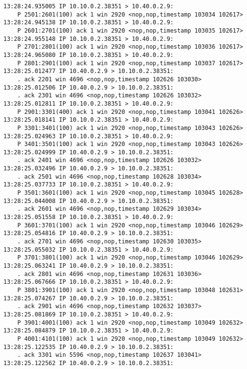 \documentclass[a4paper,12pt]{article}
\begin{document}
\begin{Verbatim}
13:28:24.935005 IP 10.10.0.2.38351 > 10.40.0.2.9: 
    P 2501:2601(100) ack 1 win 2920 <nop,nop,timestamp 103034 102617>
13:28:24.945138 IP 10.10.0.2.38351 > 10.40.0.2.9: 
    P 2601:2701(100) ack 1 win 2920 <nop,nop,timestamp 103035 102617>
13:28:24.955148 IP 10.10.0.2.38351 > 10.40.0.2.9: 
    P 2701:2801(100) ack 1 win 2920 <nop,nop,timestamp 103036 102617>
13:28:24.965080 IP 10.10.0.2.38351 > 10.40.0.2.9: 
    P 2801:2901(100) ack 1 win 2920 <nop,nop,timestamp 103037 102617>
13:28:25.012477 IP 10.40.0.2.9 > 10.10.0.2.38351: 
    . ack 2201 win 4696 <nop,nop,timestamp 102626 103030>
13:28:25.012506 IP 10.40.0.2.9 > 10.10.0.2.38351: 
    . ack 2301 win 4696 <nop,nop,timestamp 102626 103032>
13:28:25.012811 IP 10.10.0.2.38351 > 10.40.0.2.9: 
    P 2901:3301(400) ack 1 win 2920 <nop,nop,timestamp 103041 102626>
13:28:25.018141 IP 10.10.0.2.38351 > 10.40.0.2.9: 
    P 3301:3401(100) ack 1 win 2920 <nop,nop,timestamp 103043 102626>
13:28:25.024963 IP 10.10.0.2.38351 > 10.40.0.2.9: 
    P 3401:3501(100) ack 1 win 2920 <nop,nop,timestamp 103043 102626>
13:28:25.024999 IP 10.40.0.2.9 > 10.10.0.2.38351: 
    . ack 2401 win 4696 <nop,nop,timestamp 102626 103032>
13:28:25.032496 IP 10.40.0.2.9 > 10.10.0.2.38351: 
    . ack 2501 win 4696 <nop,nop,timestamp 102628 103034>
13:28:25.037733 IP 10.10.0.2.38351 > 10.40.0.2.9: 
    P 3501:3601(100) ack 1 win 2920 <nop,nop,timestamp 103045 102628>
13:28:25.044008 IP 10.40.0.2.9 > 10.10.0.2.38351: 
    . ack 2601 win 4696 <nop,nop,timestamp 102629 103034>
13:28:25.051558 IP 10.10.0.2.38351 > 10.40.0.2.9: 
    P 3601:3701(100) ack 1 win 2920 <nop,nop,timestamp 103046 102629>
13:28:25.054816 IP 10.40.0.2.9 > 10.10.0.2.38351: 
    . ack 2701 win 4696 <nop,nop,timestamp 102630 103035>
13:28:25.055032 IP 10.10.0.2.38351 > 10.40.0.2.9: 
    P 3701:3801(100) ack 1 win 2920 <nop,nop,timestamp 103046 102629>
13:28:25.063241 IP 10.40.0.2.9 > 10.10.0.2.38351: 
    . ack 2801 win 4696 <nop,nop,timestamp 102631 103036>
13:28:25.067666 IP 10.10.0.2.38351 > 10.40.0.2.9: 
    P 3801:3901(100) ack 1 win 2920 <nop,nop,timestamp 103048 102631>
13:28:25.074267 IP 10.40.0.2.9 > 10.10.0.2.38351: 
    . ack 2901 win 4696 <nop,nop,timestamp 102632 103037>
13:28:25.081869 IP 10.10.0.2.38351 > 10.40.0.2.9: 
    P 3901:4001(100) ack 1 win 2920 <nop,nop,timestamp 103049 102632>
13:28:25.084879 IP 10.10.0.2.38351 > 10.40.0.2.9: 
    P 4001:4101(100) ack 1 win 2920 <nop,nop,timestamp 103049 102632>
13:28:25.122535 IP 10.40.0.2.9 > 10.10.0.2.38351: 
    . ack 3301 win 5596 <nop,nop,timestamp 102637 103041>
13:28:25.122562 IP 10.40.0.2.9 > 10.10.0.2.38351: 

\end{Verbatim}
\end{document}
